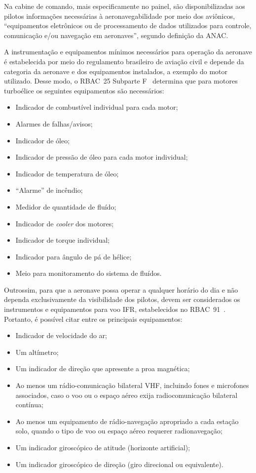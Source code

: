 Na cabine de comando, mais especificamente no painel, são disponibilizadas aos
pilotos informações necessárias à aeronavegabilidade por meio dos aviônicos,
``equipamentos eletrônicos ou de processamento de dados utilizados para
controle, comunicação e/ou navegação em aeronaves'', segundo definição da
ANAC.

A instrumentação e equipamentos mínimos necessários para operação da aeronave é
estabelecida por meio do regulamento brasileiro de aviação civil e depende da
categoria da aeronave e dos equipamentos instalados, a exemplo do motor
utilizado. Desse modo, o RBAC~25 Subparte F~\cite{rbac25} determina que para
motores turboélice os seguintes equipamentos são necessários:

\begin{itemize}
    \item Indicador de combustível individual para cada motor;
    \item Alarmes de falhas/avisos;
    \item Indicador de óleo;
    \item Indicador de pressão de óleo para cada motor individual;
    \item Indicador de temperatura de óleo;
    \item ``Alarme'' de incêndio;
    \item Medidor de quantidade de fluído;
    \item Indicador de \textit{cooler} dos motores;
    \item Indicador de torque individual;
    \item Indicador para ângulo de pá de hélice;
    \item Meio para monitoramento do sistema de fluídos.
\end{itemize}

Outrossim, para que a aeronave possa operar a qualquer horário do dia e não
dependa exclusivamente da visibilidade dos pilotos, devem ser considerados os
instrumentos e equipamentos para voo IFR, estabelecidos no
RBAC~91~\cite{rbac91}. Portanto, é possível citar entre os principais
equipamentos:

\begin{itemize}
    \item Indicador de velocidade do ar;
    \item Um altímetro;
    \item Um indicador de direção que apresente a proa magnética;
    \item Ao menos um rádio-comunicação bilateral VHF, incluindo fones e
    microfones associados, caso o voo ou o espaço aéreo exija radiocomunicação
    bilateral contínua;
    \item Ao menos um equipamento de rádio-navegação apropriado a cada estação
    solo, quando o tipo de voo ou espaço aéreo requerer radionavegação;
    \item Um indicador giroscópico de atitude (horizonte artificial);
    \item Um indicador giroscópico de direção (giro direcional ou equivalente).
\end{itemize}

